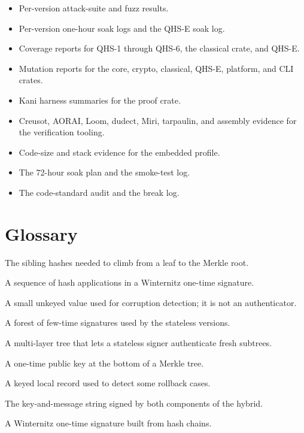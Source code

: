 \documentclass[11pt,a4paper]{article}
\begin{document}
\begin{itemize}
  \item Per-version attack-suite and fuzz results.
  \item Per-version one-hour soak logs and the QHS-E soak log.
  \item Coverage reports for QHS-1 through QHS-6, the classical crate, and
  QHS-E.
  \item Mutation reports for the core, crypto, classical, QHS-E, platform, and
  CLI crates.
  \item Kani harness summaries for the proof crate.
  \item Creusot, AORAI, Loom, dudect, Miri, tarpaulin, and assembly evidence
  for the verification tooling.
  \item Code-size and stack evidence for the embedded profile.
  \item The 72-hour soak plan and the smoke-test log.
  \item The code-standard audit and the break log.
\end{itemize}

\section{Glossary}

\begin{description}[style=nextline]
  \item[Authentication path] The sibling hashes needed to climb from a leaf to
  the Merkle root.
  \item[Chain] A sequence of hash applications in a Winternitz one-time
  signature.
  \item[Checksum] A small unkeyed value used for corruption detection; it is
  not an authenticator.
  \item[FORS] A forest of few-time signatures used by the stateless versions.
  \item[Hypertree] A multi-layer tree that lets a stateless signer authenticate
  fresh subtrees.
  \item[Leaf] A one-time public key at the bottom of a Merkle tree.
  \item[State guard] A keyed local record used to detect some rollback cases.
  \item[Transcript] The key-and-message string signed by both components of the
  hybrid.
  \item[WOTS] A Winternitz one-time signature built from hash chains.
\end{description}
\end{document}
